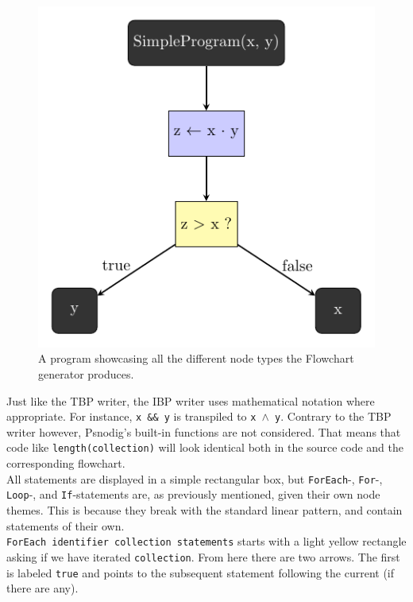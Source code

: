 \begin{figure}[ht]
    \centering
    \includegraphics[scale=.75]{assets/chapter4/SimpleProgram_ibp.pdf}
    \caption{A program showcasing all the different node types the Flowchart generator produces.}
    \label{flowchartColours}
\end{figure}

Just like the TBP writer, the IBP writer uses mathematical notation where appropriate. For instance, \texttt{x \&\& y} is transpiled to \texttt{x $\land$ y}. Contrary to the TBP writer however, Psnodig's built-in functions are not considered. That means that code like \texttt{length(collection)} will look identical both in the source code and the corresponding flowchart. \\

All statements are displayed in a simple rectangular box, but \texttt{ForEach}-, \texttt{For}-, \texttt{Loop}-, and \texttt{If}-statements are, as previously mentioned, given their own node themes. This is because they break with the standard linear pattern, and contain statements of their own. \\

\texttt{ForEach identifier collection statements} starts with a light yellow rectangle asking if we have iterated \texttt{collection}. From here there are two arrows. The first is labeled \texttt{true} and points to the subsequent statement following the current \texttt{\ForEach} (if there are any). \\

